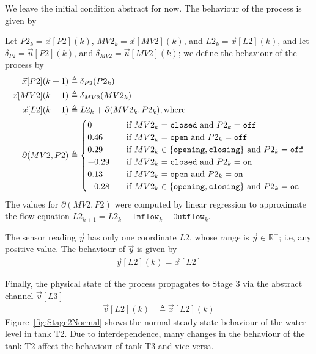 {We leave the initial condition abstract for now. The behaviour of the process is given by

Let $P2_k=\vec{x}[P2](k)$, $MV2_k=\vec{x}[MV2](k)$, and $L2_k=\vec{x}[L2](k)$, and let $\delta_{P2}=\vec{u}[P2](k)$, and $\delta_{MV2}=\vec{u}[MV2](k)$; we define the behaviour of the process by
\begin{align*}
\vec{x}[P2](k+1)&\triangleq \delta_{P2}(P2_k)\\
\vec{x}[MV2](k+1)&\triangleq \delta_{MV2}(MV2_k)\\
\vec{x}[L2](k+1)&\triangleq L2_k+\partial(MV2_k,P2_k),\text{where}\\
\partial(MV2,P2)&\triangleq
\begin{cases}
  0&\quad \text{if $MV2_k=\texttt{closed}$ and $P2_k=\texttt{off}$}\\
  0.46&\quad \text{if $MV2_k=\texttt{open}$ and $P2_k=\texttt{off}$}\\
  0.29&\quad \text{if $MV2_k\in\left\{\texttt{opening},\texttt{closing}\right\}$ and $P2_k=\texttt{off}$}\\
  -0.29&\quad \text{if $MV2_k=\texttt{closed}$ and $P2_k=\texttt{on}$}\\
  0.13&\quad \text{if $MV2_k=\texttt{open}$ and $P2_k=\texttt{on}$}\\
  -0.28&\quad \text{if $MV2_k\in\left\{\texttt{opening},\texttt{closing}\right\}$ and $P2_k=\texttt{on}$}\\  
\end{cases}
\end{align*}
The values for $\partial(MV2,P2)$ were computed by linear regression to approximate the flow equation $L2_{k+1}=L2_{k}+\texttt{Inflow}_k-\texttt{Outflow}_k$.

The sensor reading $\vec{y}$ has only one coordinate $L2$, whose range is $\vec{y}\in \mathbb{R}^+$; i.e, any positive value. The behaviour of $\vec{y}$ is given by 
\begin{align}
  \vec{y}[L2](k)=\vec{x}[L2]
\end{align}

Finally, the physical state of the process propagates to Stage 3 via the abstract channel $\vec{v}[L3]$
\begin{align}
  \vec{v}[L2](k)&\triangleq \vec{x}[L2](k)
\end{align}
Figure~\ref{fig:Stage2Normal} shows the normal steady state behaviour of the water level in tank T2. Due to interdependence, many changes in the behaviour of the tank T2 affect the behaviour of tank T3 and vice versa. 

}
